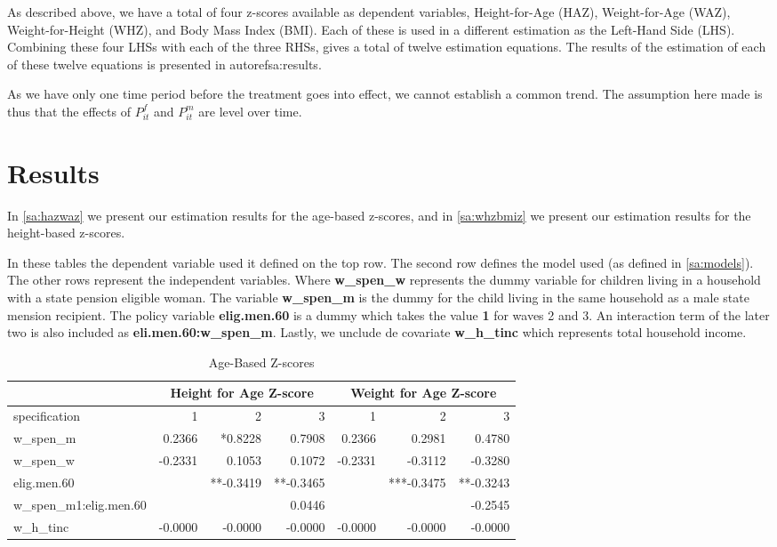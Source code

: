 \begin{refsection}
As described above, we have a total of four z-scores available as dependent variables, Height-for-Age (HAZ), Weight-for-Age (WAZ), Weight-for-Height (WHZ), and Body Mass Index (BMI). Each of these is used in a different estimation as the Left-Hand Side (LHS).
Combining these four LHSs with each of the three RHSs, gives a total of twelve estimation equations.
The results of the estimation of each of these twelve equations is presented in autoref{sa:results}.

As we have only one time period before the treatment goes into effect,
we cannot establish a common trend.
The assumption here made is thus that the effects of $P^f_{it}$ and $P^m_{it}$ are level over time.


\section{Results}
\label{sa:results}
In \autoref{sa:hazwaz} we present our estimation results for the age-based z-scores,
and in \autoref{sa:whzbmiz} we present our estimation results for the height-based z-scores.

In these tables the dependent variable used it defined on the top row.
The second row defines the model used (as defined in \autoref{sa:models}).
The other rows represent the independent variables.
Where \textbf{w\_spen\_w} represents the dummy variable for children living in a household with a state pension eligible woman.
The variable \textbf{w\_spen\_m} is the dummy for the child living in the same household as a male state mension recipient.
The policy variable \textbf{elig.men.60} is a dummy which takes the value \textbf{1} for waves 2 and 3.
An interaction term of the later two is also included as \textbf{eli.men.60:w\_spen\_m}.
Lastly, we unclude de covariate \textbf{w\_h\_tinc} which represents total household income.

\begin{table}[!ht]
\centering
\caption{Age-Based Z-scores}
\label{sa:hazwaz}
\begin{tabular}{l|rrr|rrr}
& \multicolumn{3}{c}{Height for Age Z-score} & \multicolumn{3}{c}{Weight for Age Z-score}\\
\hline
specification & 1 & 2 & 3 & 1 & 2 & 3\\
\hline
w\_spen\_m & 0.2366 & *0.8228 & 0.7908 & 0.2366 & 0.2981 & 0.4780 \\
w\_spen\_w & -0.2331 & 0.1053 & 0.1072 & -0.2331 & -0.3112 & -0.3280 \\
elig.men.60 & & **-0.3419 & **-0.3465 & & ***-0.3475 & **-0.3243 \\
w\_spen\_m1:elig.men.60 & & & 0.0446 & & & -0.2545 \\
w\_h\_tinc & -0.0000 & -0.0000 & -0.0000 & -0.0000 & -0.0000 & -0.0000 \\
\end{tabular}
\end{table}


\end{refsection}
